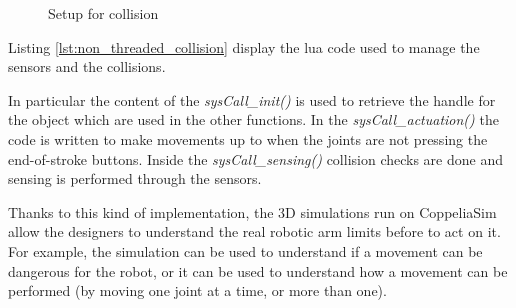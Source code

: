 \begin{figure}[h!]
\centering
{}
\qquad
{}
\caption{Setup for collision}
\label{collision_setup}
\end{figure}

Listing \ref{lst:non_threaded_collision} display the lua code used to manage the sensors and the collisions. 

In particular the content of the \textit{sysCall\_init()} is used to retrieve the handle for the object which are used in the other functions. In the \textit{sysCall\_actuation()} the code is written to make movements up to when the joints are not pressing the end-of-stroke buttons. Inside the \textit{sysCall\_sensing()} collision checks are done and sensing is performed through the sensors.



Thanks to this kind of implementation, the 3D simulations run on CoppeliaSim allow the designers to understand the real robotic arm limits before to act on it. For example, the simulation can be used to understand if a movement can be dangerous for the robot, or it can be used to understand how a movement can be performed (by moving one joint at a time, or more than one).

